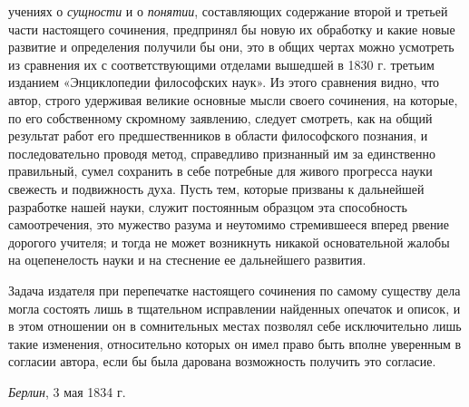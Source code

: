 учениях о {\em сущности} и о
{\em понятии}, составляющих содержание второй и третьей
части настоящего сочинения, предпринял бы новую их обработку и какие новые
развитие и определения получили бы они, это в общих чертах можно усмотреть
из сравнения их с соответствующими отделами вышедшей в 1830 г. третьим
изданием «Энциклопедии философских наук». Из этого сравнения видно, что
автор, строго удерживая великие основные мысли своего сочинения, на
которые, по его собственному скромному заявлению, следует смотреть, как на
общий результат работ его предшественников в области философского познания,
и последовательно проводя метод, справедливо признанный им за единственно
правильный, сумел сохранить в себе потребные для живого прогресса науки
свежесть и подвижность духа. Пусть тем, которые призваны к дальнейшей
разработке нашей науки, служит постоянным образцом эта способность
самоотречения, это мужество разума и неутомимо стремившееся вперед рвение
дорогого учителя; и тогда не может возникнуть никакой основательной жалобы
на оцепенелость науки и на стеснение ее дальнейшего развития.

Задача издателя при перепечатке настоящего сочинения по самому существу дела
могла состоять лишь в тщательном исправлении найденных опечаток и описок, и
в этом отношении он в сомнительных местах позволял себе исключительно лишь
такие изменения, относительно которых он имел право быть вполне уверенным в
согласии автора, если бы была дарована возможность получить это согласие.

{\em Берлин}, 3 мая 1834 г.\textstylexxxviii{ }

\clearpage\setcounter{page}{1}\subsubsection[Примечания]{}
\hypertarget{Toc478978777}{}
\bigskip


\bigskip

